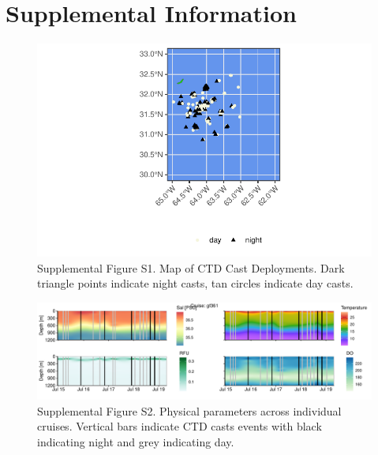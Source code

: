 \documentclass[
]{article}
\begin{document}
\hypertarget{supplemental-information}{%
\section{Supplemental Information}\label{supplemental-information}}

\begin{figure}

{\centering \includegraphics{index_files/figure-pdf/unnamed-chunk-17-1.pdf}

}

\caption{Supplemental Figure S1. Map of CTD Cast Deployments. Dark
triangle points indicate night casts, tan circles indicate day casts.}

\end{figure}

\begin{figure}

{\centering \includegraphics[width=1\textwidth,height=\textheight]{index_files/figure-pdf/unnamed-chunk-19-1.pdf}

}

\caption{Supplemental Figure S2. Physical parameters across individual
cruises. Vertical bars indicate CTD casts events with black indicating
night and grey indicating day.}

\end{figure}
\end{document}
